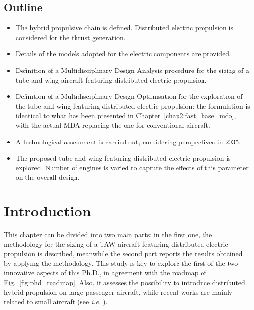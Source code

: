 \minitoc

\clearpage

\begin{mdframed}[hidealllines=true,backgroundcolor=purple!20]
	\section*{Outline}
	
	\begin{itemize}
	
		\item The hybrid propulsive chain is defined. Distributed electric propulsion is considered for the thrust generation.  
		
		\item Details of the models adopted for the electric components are provided. 
		
		\item Definition of a Multidisciplinary Design Analysis procedure for the sizing of a tube-and-wing aircraft featuring distributed electric propulsion. 
		
		\item Definition of a Multidisciplinary Design Optimisation for the exploration of the tube-and-wing featuring distributed electric propulsion: the formulation is identical to what has been presented in Chapter~\ref{chap2:fast_base_mdo}, with the actual MDA replacing the one for conventional aircraft.
		
		\item A technological assessment is carried out, considering perspectives in 2035. 
		
		\item The proposed tube-and-wing featuring distributed electric propulsion is explored. 
		Number of engines is varied to capture the effects of this parameter on the overall design. 
		
	\end{itemize}
	
\end{mdframed}

\cleardoublepage

\section{Introduction}
\label{sec:chap3_intro}

This chapter can be divided into two main parts: in the first one, the methodology for the sizing of a TAW aircraft featuring distributed electric propulsion is described, meanwhile the second part reports the results obtained by applying the methodology. 
This study is key to explore the first of the two innovative aspects of this Ph.D., in agreement with the roadmap of Fig.~\ref{fig:phd_roadmap}.
Also, it assesses the possibility to introduce distributed hybrid propulsion on large passenger aircraft, while recent works are mainly related to small aircraft (see \textit{i.e.} \cite{bib:ampere_ref, bib:borer_sceptor}). 

